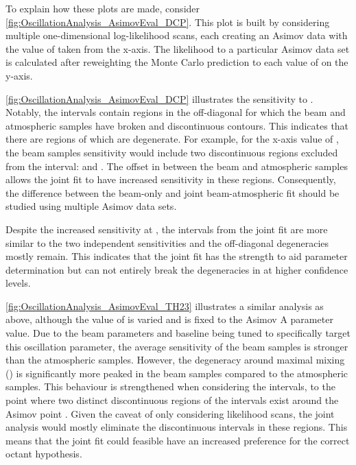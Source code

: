 To explain how these plots are made, consider \autoref{fig:OscillationAnalysis_AsimovEval_DCP}. This plot is built by considering multiple one-dimensional log-likelihood scans, each creating an Asimov data with the value of  taken from the x-axis. The likelihood to a particular Asimov data set is calculated after reweighting the Monte Carlo prediction to each value of  on the y-axis.

\autoref{fig:OscillationAnalysis_AsimovEval_DCP} illustrates the sensitivity to . Notably, the \quickmath{1\sigma} intervals contain regions in the off-diagonal for which the beam and atmospheric samples have broken and discontinuous contours. This indicates that there are regions of  which are degenerate. For example, for the x-axis value of , the beam samples sensitivity would include two discontinuous regions excluded from the \quickmath{1\sigma} interval:  and . The offset in  between the beam and atmospheric samples allows the joint fit to have increased sensitivity in these regions. Consequently, the difference between the beam-only and joint beam-atmospheric fit should be studied using multiple Asimov data sets.

Despite the increased sensitivity at \quickmath{1\sigma}, the \quickmath{2\sigma} intervals from the joint fit are more similar to the two independent sensitivities and the off-diagonal degeneracies mostly remain. This indicates that the joint fit has the strength to aid parameter determination but can not entirely break the degeneracies in  at higher confidence levels. 

\autoref{fig:OscillationAnalysis_AsimovEval_TH23} illustrates a similar analysis as above, although the value of  is varied and  is fixed to the Asimov A parameter value. Due to the beam parameters and baseline being tuned to specifically target this oscillation parameter, the average sensitivity of the beam samples is stronger than the atmospheric samples. However, the degeneracy around maximal mixing () is significantly more peaked in the beam samples compared to the atmospheric samples. This behaviour is strengthened when considering the \quickmath{2\sigma} intervals, to the point where two distinct discontinuous regions of the \quickmath{2\sigma} intervals exist around the Asimov point . Given the caveat of only considering likelihood scans, the joint analysis would mostly eliminate the discontinuous intervals in these regions. This means that the joint fit could feasible have an increased preference for the correct octant hypothesis.

